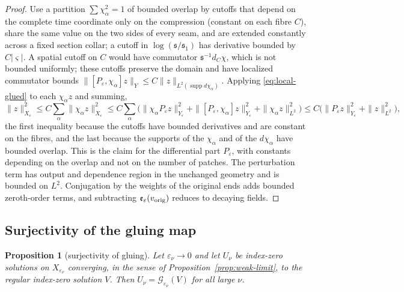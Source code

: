 \documentclass[11pt]{amsart}
\newtheorem{proposition}[theorem]{Proposition}
\theoremstyle{definition}
\theoremstyle{remark}
\theoremstyle{plain}
\numberwithin{equation}{section}
\newcommand{\cG}{\mathcal{G}}
\newcommand{\eps}{\varepsilon}
\begin{document}
\begin{proof}
Use a partition $\sum\chi_\alpha^2=1$ of bounded overlap by cutoffs that depend
on the complete time coordinate only on the compression (constant on each
fibre $C$), share the same value on the two sides of every seam, and are
extended constantly across a fixed section collar; a cutoff in
$\log({\mathfrak s}/{\mathfrak s}_1)$ has derivative bounded by $C|\varsigma|$. A spatial cutoff on $C$
would have commutator ${\mathfrak s}^{-1}d_C\chi$, which is not bounded uniformly; these
cutoffs preserve the domain and have localized commutator bounds
$\|[P_\eps,\chi_\alpha]z\|_Y\le C\|z\|_{L^2(\operatorname{supp}d\chi_\alpha)}$. Applying \eqref{eq:local-glued} to each
$\chi_\alpha z$ and summing,
\[
\|z\|_{X_\eps}^2\le C\sum_\alpha\|\chi_\alpha z\|_{X_\eps}^2
\le C\sum_\alpha\bigl(\|\chi_\alpha P_\eps z\|_{Y_\eps}^2+\|[P_\eps,\chi_\alpha]z\|_{Y_\eps}^2
+\|\chi_\alpha z\|_{L^2}^2\bigr)\le C\bigl(\|P_\eps z\|_{Y_\eps}^2+\|z\|_{L^2}^2\bigr),
\]
the first inequality because the cutoffs have bounded derivatives and are constant on the
fibres, and the last because the supports of the $\chi_\alpha$ and of the $d\chi_\alpha$ have
bounded overlap. This is the claim for the differential part $P_\eps$, with constants
depending on the overlap and not on the number of patches. The perturbation
term has output and dependence region in the unchanged geometry and is bounded
on $L^2$. Conjugation by the weights of the original ends adds bounded zeroth-order terms, and
subtracting $\mathfrak e_\eps(v_{\rm orig})$ reduces to decaying fields.
\end{proof}

\subsection{Surjectivity of the gluing map}

\begin{proposition}[surjectivity of gluing]\label{prop:coverage}
Let $\eps_\nu\to0$ and let $U_\nu$ be index-zero solutions on
$X_{\eps_\nu}$ converging, in the sense of
Proposition~\ref{prop:weak-limit}, to the regular index-zero solution
$V$. Then $U_\nu=\cG_{\eps_\nu}(V)$ for all large $\nu$.
\end{proposition}
\end{document}
